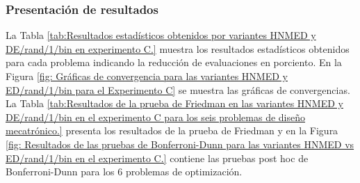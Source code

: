 \begin{table}[]
	\centering
	\caption{Tamaños de población utilizados para cada problema en el Experimento C.}
	\label{tab:Tamaños de población utilizados para cada problema en el Experimento C.}
\end{table}


\subsubsection{Presentación de resultados}
La Tabla \ref{tab:Resultados estadísticos obtenidos por variantes HNMED y DE/rand/1/bin  en experimento C.} muestra los resultados estadísticos obtenidos para cada problema indicando la reducción de evaluaciones en porciento. En la Figura \ref{fig: Gráficas de convergencia para las variantes HNMED y ED/rand/1/bin para el Experimento C} se muestra las gráficas de convergencias. La Tabla \ref{tab:Resultados de la prueba de Friedman en las variantes HNMED y DE/rand/1/bin en el experimento C para los seis problemas de diseño mecatrónico.} presenta los resultados de la prueba de Friedman y en la Figura \ref{fig: Resultados de las pruebas de Bonferroni-Dunn para las variantes HNMED vs ED/rand/1/bin en el experimento C.} contiene las pruebas post hoc de Bonferroni-Dunn para los 6 problemas de optimización.



